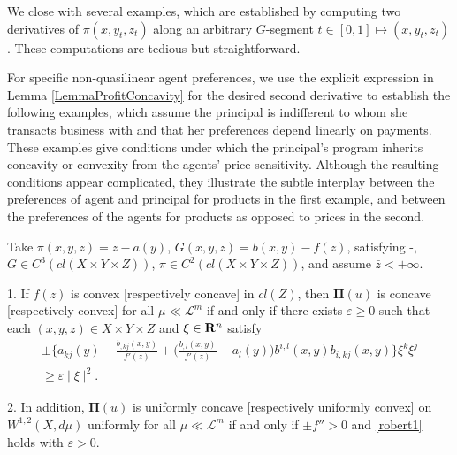 We  close with several examples,  which are established by computing two derivatives
of $\pi(x,y_t,z_t)$ along an arbitrary $G$-segment $t\in [0,1] \longmapsto (x,y_t,z_t)$.
These computations are tedious but straightforward.\medskip

For specific non-quasilinear agent preferences,  we use the explicit expression in Lemma \ref{LemmaProfitConcavity} for the 
desired second derivative to establish the following examples,  which assume the principal is indifferent to
whom she transacts business with and that her preferences depend linearly on payments.  
These examples give conditions under which the principal's program inherits concavity or convexity 
from the agents' price sensitivity.
Although the resulting conditions appear complicated,  they illustrate
the subtle interplay between the preferences of agent and principal for products in the first example,
and between the preferences of the agents for products as opposed to prices in the second. \medskip



\begin{example}
	\label{general example1}
	Take $\pi(x, y, z) =z- a(y)$, $G(x, y, z) = b(x,y)-f(z)$, satisfying \Gzero-\Gsix,  $G \in C^3(cl(X\times Y \times Z)
	)$, $\pi \in C^2(cl(X\times Y \times Z)
	)$, and assume $\bar{z}<+\infty$.
	
	1. If $f(z)$ is convex [respectively concave] in $cl(Z)$, then $\pmb \Pi(u)$ is concave [respectively convex] for all $\mu\ll \mathcal{L}^m$ if and only if there exists $\varepsilon \ge 0$ such that each $(x,y,z) \in X \times Y\times Z$ and $\xi \in {\mathbf R}^{n}$ satisfy 
	\begin{equation}\label{robert1}
	\begin{split}
	\pm \Bigg\{a_{kj}(y)-\frac{b_{,kj}(x,y)}{f'(z)}+\Big(\frac{b_{,l}(x,y)}{f'(z)}- a_l(y)\Big)b^{i,l}(x,y) b_{i,kj}(x,y)\Bigg\} \xi^{k}\xi^{j} \\
	\ge  \varepsilon \mid \xi\mid ^2.
	\end{split}
	\end{equation}
	
	2. In addition, $\pmb \Pi(u)$ is uniformly concave [respectively uniformly convex] on $W^{1,2}(X,d\mu)$  uniformly for all $\mu\ll \mathcal{L}^m$ if and only if $\pm f''> 0$ and  \eqref{robert1} holds with $\varepsilon >0$.
\end{example}

